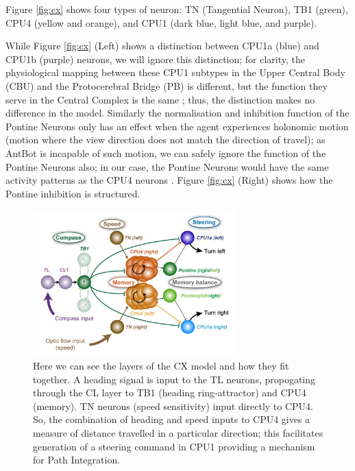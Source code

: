 \documentclass[a4paper,11pt,twoside,openright]{article}
\begin{document}
Figure \ref{fig:cx} shows four types of neuron: TN (Tangential Neuron), TB1
(green), CPU4 (yellow and orange), and CPU1 (dark blue, light blue, and purple).
\newline
\par

While Figure \ref{fig:cx} (Left) shows a distinction between CPU1a (blue) and
CPU1b (purple) neurons, we will ignore this distinction; for clarity, the
physiological mapping between these CPU1 subtypes in the Upper Central Body (CBU)
and the Protocerebral Bridge (PB) is different, but the function they serve in
the Central Complex is the same \cite{Stone2017}; thus, the distinction makes
no difference in the model. Similarly the normalisation and inhibition function
of the Pontine Neurons only has an effect when the agent experiences holonomic
motion (motion where the view direction does not match the direction of travel);
as AntBot is incapable of such motion, we can safely ignore the function of
the Pontine Neurons also; in our case, the Pontine Neurons would have the
same activity patterns as the CPU4 neurons \cite{Stone2017}. Figure \ref{fig:cx}
(Right) shows how the Pontine inhibition is structured.
\newline
\par

\begin{figure}[h!]
  \centering
  \includegraphics[width=0.7\textwidth]{Figure5F}
  \caption{
    \label{fig:cxlayer} Here we can see the layers of the CX model and
    how they fit together. A heading signal is input to the TL neurons,
    propogating through the CL layer to TB1 (heading ring-attractor) and
    CPU4 (memory). TN neurons (speed sensitivity) input directly to CPU4.
    So, the combination of heading and speed inputs to CPU4 gives a measure
    of distance travelled in a particular direction; this facilitates generation
    of a steering command in CPU1 providing a mechanism for Path Integration.
  }
\end{figure}
\end{document}

